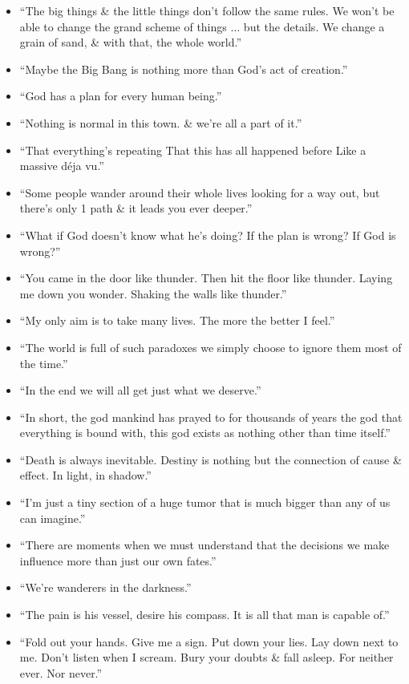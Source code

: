 \documentclass{article}
\begin{document}
\begin{enumerate}
\begin{itemize}
		\item ``The big things \& the little things don't follow the same rules. We won't be able to change the grand scheme of things $\ldots$ but the details. We change a grain of sand, \& with that, the whole world.''
		\item ``Maybe the Big Bang is nothing more than God's act of creation.''
		\item ``God has a plan for every human being.''
		\item ``Nothing is normal in this town. \& we're all a part of it.''
		\item ``That everything's repeating That this has all happened before Like a massive d\'eja vu.''
		\item ``Some people wander around their whole lives looking for a way out, but there's only 1 path \& it leads you ever deeper.''
		\item ``What if God doesn't know what he's doing? If the plan is wrong? If God is wrong?''
		\item ``You came in the door like thunder. Then hit the floor like thunder. Laying me down you wonder. Shaking the walls like thunder.''
		\item ``My only aim is to take many lives. The more the better I feel.''
		\item ``The world is full of such paradoxes we simply choose to ignore them most of the time.''
		\item ``In the end we will all get just what we deserve.''
		\item ``In short, the god mankind has prayed to for thousands of years the god that everything is bound with, this god exists as nothing other than time itself.''
		\item ``Death is always inevitable. Destiny is nothing but the connection of cause \& effect. In light, in shadow.''
		\item ``I'm just a tiny section of a huge tumor that is much bigger than any of us can imagine.''
		\item ``There are moments when we must understand that the decisions we make influence more than just our own fates.''
		\item ``We're wanderers in the darkness.''
		\item ``The pain is his vessel, desire his compass. It is all that man is capable of.''
		\item ``Fold out your hands. Give me a sign. Put down your lies. Lay down next to me. Don't listen when I scream. Bury your doubts \& fall asleep. For neither ever. Nor never.''

\end{itemize}
\end{enumerate}
\end{document}
